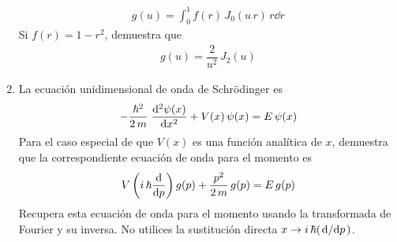 \begin{enumerate}
\begin{align*}
g(u) = \int_{0}^{1} f(r) \, J_{0} (u \, r) \, r \dd{r}
\end{align*}
Si $f(r) = 1 - r^{2}$, demuestra que
\begin{align*}
g(u) = \dfrac{2}{u^{2}} \, J_{2}(u)
\end{align*}
\item La ecuación unidimensional de onda de Schrödinger es
\begin{align*}
- \dfrac{\hbar^{2}}{2 \, m} \; \dv[2]{\psi(x)}{x} +  V(x) \, \psi(x) = E \, \psi (x)
\end{align*}
Para el caso especial de que $V(x)$ es una función analítica de $x$, demuestra que la correspondiente ecuación de onda para el momento es
\begin{align*}
V \left( i \, \hbar \dv{p} \right) g(p) + \dfrac{p^{2}}{2 \, m} \, g(p) =  E \, g(p)
\end{align*}
Recupera esta ecuación de onda para el momento usando la transformada de Fourier y su inversa. No utilices la sustitución directa $\displaystyle{x \to i \, \hbar (\dv*{p})}$.
\end{enumerate}
